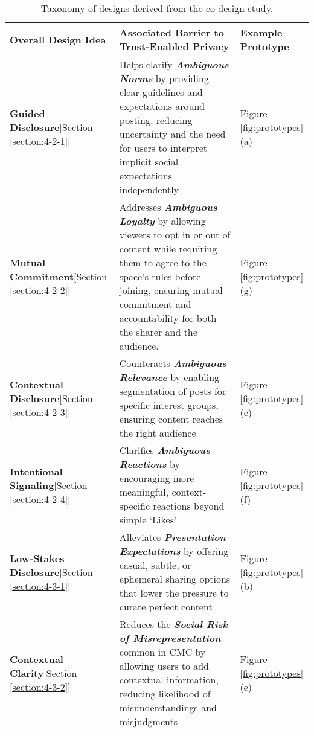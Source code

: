 \begin{table*}[!ht]
\centering
\small
\caption{Taxonomy of designs derived from the co-design study.}
\label{tab:designs}
\begin{tabular}{p{3.5cm} p{12cm} p{1.5cm}}
\toprule
\textbf{Overall Design Idea} & \textbf{Associated Barrier to Trust-Enabled Privacy} & \textbf{Example Prototype} \\ 
\midrule

\textbf{Guided Disclosure}\newline{}[Section \ref{section:4-2-1}] & Helps clarify \textbf{\textit{Ambiguous Norms}} by providing clear guidelines and expectations around posting, reducing uncertainty and the need for users to interpret implicit social expectations independently & Figure \ref{fig:prototypes}(a) \\

\textbf{Mutual Commitment}\newline{}[Section \ref{section:4-2-2}] & Addresses \textbf{\textit{Ambiguous Loyalty}} by allowing viewers to opt in or out of content while requiring them to agree to the space's rules before joining, ensuring mutual commitment and accountability for both the sharer and the audience. & Figure \ref{fig:prototypes}(g) \\

\textbf{Contextual Disclosure}\newline{}[Section \ref{section:4-2-3}] & Counteracts \textbf{\textit{Ambiguous Relevance}} by enabling segmentation of posts for specific interest groups, ensuring content reaches the right audience & Figure \ref{fig:prototypes}(c) \\

\textbf{Intentional Signaling}\newline{}[Section \ref{section:4-2-4}] & Clarifies \textbf{\textit{Ambiguous Reactions}} by encouraging more meaningful, context-specific reactions beyond simple `Likes' & Figure \ref{fig:prototypes}(f) \\

\textbf{Low-Stakes Disclosure}\newline{}[Section \ref{section:4-3-1}] & Alleviates \textbf{\textit{Presentation Expectations}} by offering casual, subtle, or ephemeral sharing options that lower the pressure to curate perfect content & Figure \ref{fig:prototypes}(b) \\

\textbf{Contextual Clarity}\newline{}[Section \ref{section:4-3-2}] & Reduces the \textbf{\textit{Social Risk of Misrepresentation}} common in CMC by allowing users to add contextual information, reducing likelihood of misunderstandings and misjudgments & Figure \ref{fig:prototypes}(e) \\


\end{tabular}
\end{table*}
